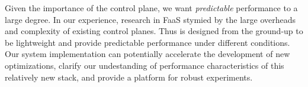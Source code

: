 Given the importance of the control plane, we want \emph{predictable} performance to a large degree. 
In our experience, research in FaaS stymied by the large overheads and complexity of existing control planes.
Thus \sysname is designed from the ground-up to be lightweight and provide predictable performance under different conditions. 
Our system implementation can potentially accelerate the development of new optimizations, clarify  our undestanding of performance characteristics of this relatively new stack, and provide a platform for robust experiments. 


